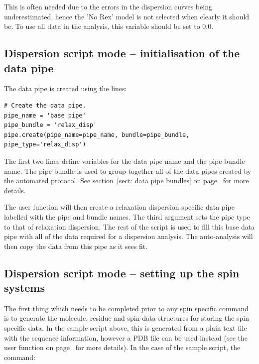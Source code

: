 This is often needed due to the errors in the dispersion curves being underestimated, hence the 'No Rex' model is not selected when clearly it should be.
To use all data in the analysis, this variable should be set to 0.0.



\subsection{Dispersion script mode -- initialisation of the data pipe} \label{sect: dispersion initialisation}

The data pipe is created using the lines:

\begin{lstlisting}[firstnumber=40]
# Create the data pipe.
pipe_name = 'base pipe'
pipe_bundle = 'relax_disp'
pipe.create(pipe_name=pipe_name, bundle=pipe_bundle, pipe_type='relax_disp')
\end{lstlisting}

The first two lines define variables for the data pipe name and the pipe bundle name.  The pipe bundle is used to group together all of the data pipes created by the automated protocol.  See section~\ref{sect: data pipe bundles} on page~\pageref{sect: data pipe bundles} for more details.

The  user function will then create a relaxation dispersion specific data pipe labelled with the pipe and bundle names.  The third argument sets the pipe type to that of relaxation dispersion.  The rest of the script is used to fill this base data pipe with all of the data required for a dispersion analysis.  The auto-analysis will then copy the data from this pipe as it sees fit.



\subsection{Dispersion script mode -- setting up the spin systems}

The first thing which needs to be completed prior to any spin specific command is to generate the molecule, residue and spin data structures for storing the spin specific data.  In the sample script above, this is generated from a plain text file with the sequence information, however a PDB file can be used instead (see the  user function on page~\pageref{uf: structure.read_pdb} for more details).  In the case of the sample script, the command:

